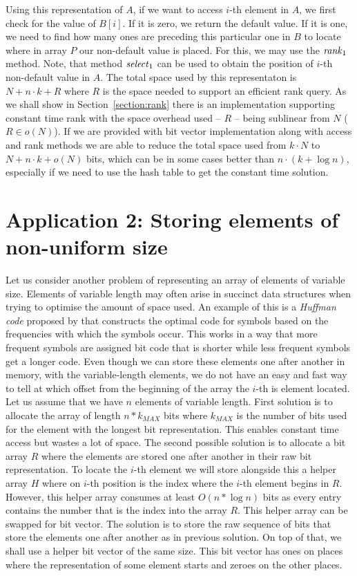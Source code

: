 Using this representation of $A$, if we want to access $i$-th element in $A$, we first check for
the value of $B[i]$. If it is zero, we return the default value. If it is one, we need to find
how many ones are preceding this particular one in $B$ to locate where in array $P$ our non-default
value is placed. For this, we may use the $\mathit{rank}_1$ method. Note, that method $\mathit{select}_1$ can
be used to obtain the position of $i$-th non-default value in $A$. The total space used by this
representaton is $N+n\cdot k+R$ where $R$ is the space needed to support an efficient rank query.
As we shall show in Section~\ref{section:rank} there is an implementation supporting constant time
rank with the space overhead used -- $R$ -- being sublinear from $N$ ($R\in o(N)$). If we are provided
with bit vector implementation along with access and rank methods we are able to reduce the total
space used from $k\cdot N$ to $N+n\cdot k+o(N)$ bits, which can be in some cases better than
$n\cdot (k+\log n)$, especially if we need to use the hash table to get the constant time solution.

\section{Application 2: Storing elements of non-uniform size}

Let us consider another problem of representing an array of elements of variable size.
Elements of variable length may often arise in succinct data structures when trying to
optimise the amount of space used. An example of this is a \textit{Huffman code}
proposed by \cite{huffman1952method} that constructs the optimal code for symbols based
on the frequencies with which the symbols occur. This works in a way that more frequent
symbols are assigned bit code that is shorter while less frequent symbols get a longer code.
Even though we can store these elements one after another in memory, with the variable-length
elements, we do not have an easy and fast way to tell at which offset from the beginning of the
array the $i$-th is element located. Let us assume that we have $n$ elements of variable length.
First solution is to allocate the array of length $n*k_{MAX}$ bits where $k_{MAX}$ is the number
of bits used for the element with the longest bit representation. This enables constant time access
but wastes a lot of space. The second possible solution is to allocate a bit array $R$ where
the elements are stored one after another in their raw bit representation. To locate the $i$-th element
we will store alongside this a helper array $H$ where on $i$-th position is the index where the $i$-th
element begins in $R$. However, this helper array consumes at least $O(n*\log n)$ bits as every entry
contains the number that is the index into the array $R$. This helper array can be swapped for bit vector.
The solution is to store the raw sequence of bits that store the elements one after another as in previous
solution. On top of that, we shall use a helper bit vector of the same size. This bit vector has ones on
places where the representation of some element starts and zeroes on the other places.

